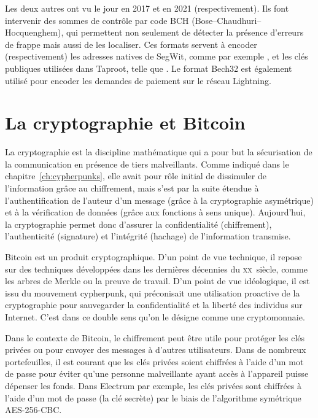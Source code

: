 Les deux autres ont vu le jour en 2017 et en 2021 (respectivement). Ils font intervenir des sommes de contrôle par code BCH (Bose–Chaudhuri–Hocquenghem), qui permettent non seulement de détecter la présence d'erreurs de frappe mais aussi de les localiser. Ces formats servent à encoder (respectivement) les adresses natives de SegWit, comme par exemple , et les clés publiques utilisées dans Taproot, telle que . Le format Bech32 est également utilisé pour encoder les demandes de paiement sur le réseau Lightning.

\section*{La cryptographie et Bitcoin}

La cryptographie est la discipline mathématique qui a pour but la sécurisation de la communication en présence de tiers malveillants. Comme indiqué dans le chapitre~\ref{ch:cypherpunks}, elle avait pour rôle initial de dissimuler de l'information grâce au chiffrement, mais s'est par la suite étendue à l'authentification de l'auteur d'un message (grâce à la cryptographie asymétrique) et à la vérification de données (grâce aux fonctions à sens unique). Aujourd'hui, la cryptographie permet donc d'assurer la confidentialité (chiffrement), l'authenticité (signature) et l'intégrité (hachage) de l'information transmise.

Bitcoin est un produit cryptographique. D'un point de vue technique, il repose sur des techniques développées dans les dernières décennies du \textsc{xx}\ieme{}~siècle, comme les arbres de Merkle ou la preuve de travail. D'un point de vue idéologique, il est issu du mouvement cypherpunk, qui préconisait une utilisation proactive de la cryptographie pour sauvegarder la confidentialité et la liberté des individus sur Internet. C'est dans ce double sens qu'on le désigne comme une cryptomonnaie.

Dans le contexte de Bitcoin, le chiffrement peut être utile pour protéger les clés privées ou pour envoyer des messages à d'autres utilisateurs. Dans de nombreux portefeuilles, il est courant que les clés privées soient chiffrées à l'aide d'un mot de passe pour éviter qu'une personne malveillante ayant accès à l'appareil puisse dépenser les fonds. Dans Electrum par exemple, les clés privées sont chiffrées à l'aide d'un mot de passe (la clé secrète) par le biais de l'algorithme symétrique AES-256-CBC.

